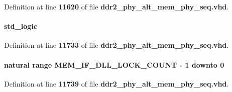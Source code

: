 Definition at line {\bf 11620} of file {\bf ddr2\+\_\+phy\+\_\+alt\+\_\+mem\+\_\+phy\+\_\+seq.\+vhd}.

\paragraph[{dis\+\_\+state}]{ {\bfseries \textcolor{comment}{std\+\_\+logic}\textcolor{vhdlchar}{ }} \hspace{0.3cm}{\ttfamily [Signal]}}\label{classddr2__phy__alt__mem__phy__ctrl_1_1struct_afaed64eed33fd6198e50c6112c183049}


Definition at line {\bf 11733} of file {\bf ddr2\+\_\+phy\+\_\+alt\+\_\+mem\+\_\+phy\+\_\+seq.\+vhd}.

\paragraph[{dll\+\_\+lock\+\_\+counter}]{ {\bfseries \textcolor{comment}{natural}\textcolor{vhdlchar}{ }\textcolor{vhdlchar}{ }\textcolor{vhdlchar}{ }\textcolor{keywordflow}{range}\textcolor{vhdlchar}{ }\textcolor{vhdlchar}{ }\textcolor{vhdlchar}{ }\textcolor{vhdlchar}{ }{\bfseries {\bf M\+E\+M\+\_\+\+I\+F\+\_\+\+D\+L\+L\+\_\+\+L\+O\+C\+K\+\_\+\+C\+O\+U\+NT}} \textcolor{vhdlchar}{-\/}\textcolor{vhdlchar}{ } \textcolor{vhdldigit}{1} \textcolor{vhdlchar}{ }\textcolor{keywordflow}{downto}\textcolor{vhdlchar}{ }\textcolor{vhdlchar}{ } \textcolor{vhdldigit}{0} \textcolor{vhdlchar}{ }} \hspace{0.3cm}{\ttfamily [Signal]}}\label{classddr2__phy__alt__mem__phy__ctrl_1_1struct_a5e9220972cedf454768126d36d16d07f}


Definition at line {\bf 11739} of file {\bf ddr2\+\_\+phy\+\_\+alt\+\_\+mem\+\_\+phy\+\_\+seq.\+vhd}.


